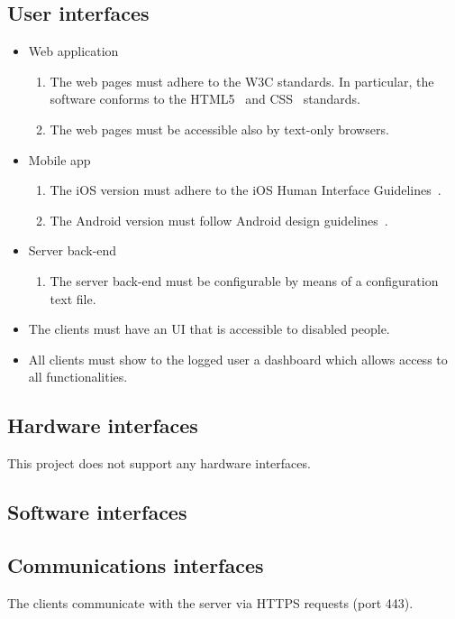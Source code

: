 \subsection{User interfaces}

\begin{itemize}
    \item Web application
        \begin{enumerate}
        \item The web pages must adhere to the W3C standards. In particular, the software conforms to the HTML5~\cite{w3c-html5} and CSS~\cite{w3c-css} standards.
        \item The web pages must be accessible also by text-only browsers.
        \end{enumerate}
    \item Mobile app
        \begin{enumerate}
        	\item The iOS version must adhere to the iOS Human Interface Guidelines~\cite{apple-ios-hig}.
	\item The Android version must follow Android design guidelines~\cite{google-android-hig}.
        \end{enumerate}
     \item Server back-end
     	\begin{enumerate}
		\item The server back-end must be configurable by means of a configuration text file.
	\end{enumerate}
	\item The clients must have an UI that is accessible to disabled people.
	\item All clients must show to the logged user a dashboard which allows access to all functionalities.
\end{itemize}

\subsection{Hardware interfaces}

This project does not support any hardware interfaces.

\subsection{Software interfaces}

\subsection{Communications interfaces}
The clients communicate with the server via HTTPS requests (port 443).